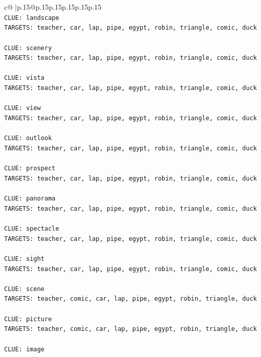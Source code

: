 \documentclass{article}
\begin{document}
{\begin{supertabular}{c@{$\;$}|p{.15\linewidth}@{}p{.15\linewidth}p{.15\linewidth}p{.15\linewidth}p{.15\linewidth}p{.15\linewidth}}
{{{\\ 
\texttt{CLUE: landscape} \\
\texttt{TARGETS: teacher, car, lap, pipe, egypt, robin, triangle, comic, duck} \\
\\ 
\texttt{CLUE: scenery} \\
\texttt{TARGETS: teacher, car, lap, pipe, egypt, robin, triangle, comic, duck} \\
\\ 
\texttt{CLUE: vista} \\
\texttt{TARGETS: teacher, car, lap, pipe, egypt, robin, triangle, comic, duck} \\
\\ 
\texttt{CLUE: view} \\
\texttt{TARGETS: teacher, car, lap, pipe, egypt, robin, triangle, comic, duck} \\
\\ 
\texttt{CLUE: outlook} \\
\texttt{TARGETS: teacher, car, lap, pipe, egypt, robin, triangle, comic, duck} \\
\\ 
\texttt{CLUE: prospect} \\
\texttt{TARGETS: teacher, car, lap, pipe, egypt, robin, triangle, comic, duck} \\
\\ 
\texttt{CLUE: panorama} \\
\texttt{TARGETS: teacher, car, lap, pipe, egypt, robin, triangle, comic, duck} \\
\\ 
\texttt{CLUE: spectacle} \\
\texttt{TARGETS: teacher, car, lap, pipe, egypt, robin, triangle, comic, duck} \\
\\ 
\texttt{CLUE: sight} \\
\texttt{TARGETS: teacher, car, lap, pipe, egypt, robin, triangle, comic, duck} \\
\\ 
\texttt{CLUE: scene} \\
\texttt{TARGETS: teacher, comic, car, lap, pipe, egypt, robin, triangle, duck} \\
\\ 
\texttt{CLUE: picture} \\
\texttt{TARGETS: teacher, comic, car, lap, pipe, egypt, robin, triangle, duck} \\
\\ 
\texttt{CLUE: image} \\
}}}
\end{supertabular}}
\end{document}
